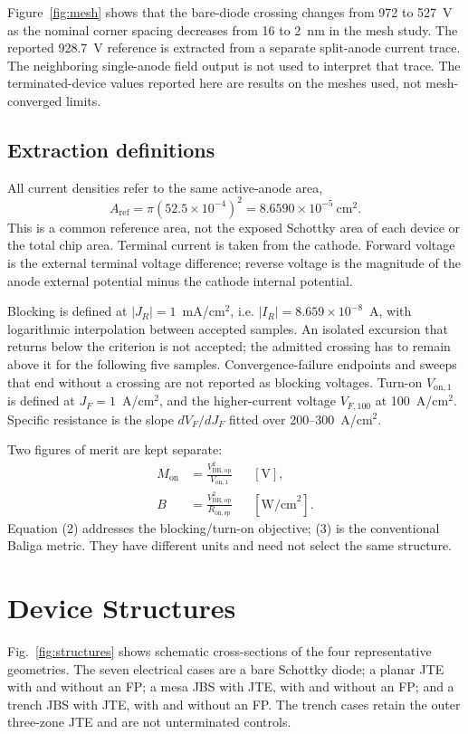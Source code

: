 \documentclass[journal,10pt]{IEEEtran}
\newcommand{\Von}{\ensuremath{V_{\mathrm{on},1}}}
\begin{document}
Figure~\ref{fig:mesh} shows that the bare-diode crossing changes from 972 to 527~V as the nominal corner spacing decreases from 16 to 2~nm in the mesh study. The reported 928.7~V reference is extracted from a separate split-anode current trace. The neighboring single-anode field output is not used to interpret that trace. The terminated-device values reported here are results on the meshes used, not mesh-converged limits.

\subsection{Extraction definitions}
All current densities refer to the same active-anode area,
\begin{equation}
A_{\mathrm{ref}}=\pi(52.5\times10^{-4})^2=8.6590\times10^{-5}\ \mathrm{cm}^2 .
\end{equation}
This is a common reference area, not the exposed Schottky area of each device or the total chip area. Terminal current is taken from the cathode. Forward voltage is the external terminal voltage difference; reverse voltage is the magnitude of the anode external potential minus the cathode internal potential.

Blocking is defined at $|J_R|=1$~mA/cm$^2$, i.e. $|I_R|=8.659\times10^{-8}$~A, with logarithmic interpolation between accepted samples. An isolated excursion that returns below the criterion is not accepted; the admitted crossing has to remain above it for the following five samples. Convergence-failure endpoints and sweeps that end without a crossing are not reported as blocking voltages. Turn-on $\Von$ is defined at $J_F=1$~A/cm$^2$, and the higher-current voltage $V_{F,100}$ at 100~A/cm$^2$. Specific resistance is the slope $dV_F/dJ_F$ fitted over 200--300~A/cm$^2$.

Two figures of merit are kept separate:
\begin{align}
M_{\mathrm{on}}&=\frac{V_{\mathrm{BR,op}}^2}{V_{\mathrm{on},1}} &&[\mathrm{V}],\\
B&=\frac{V_{\mathrm{BR,op}}^2}{R_{\mathrm{on,sp}}} &&[\mathrm{W/cm}^2].
\end{align}
Equation (2) addresses the blocking/turn-on objective; (3) is the conventional Baliga metric. They have different units and need not select the same structure.

\section{Device Structures}
Fig.~\ref{fig:structures} shows schematic cross-sections of the four representative geometries. The seven electrical cases are a bare Schottky diode; a planar JTE with and without an FP; a mesa JBS with JTE, with and without an FP; and a trench JBS with JTE, with and without an FP. The trench cases retain the outer three-zone JTE and are not unterminated controls.
\end{document}

